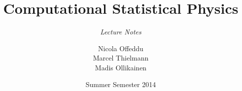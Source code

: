 \documentclass[%
paper=a4,
english,
fontsize=11.9pt,
twoside=true,
pointlessnumbers,
BCOR5mm,
titlepage=true,
headinclude,
cleardoublepage=empty,
openright,
appendixprefix,
chapterprefix=false,
DIV12
]{scrbook}
\begin{document}
\title{Computational Statistical Physics}
\subtitle{\emph{Lecture Notes}}
\author{Nicola Offeddu \\Marcel Thielmann \\Madis Ollikainen}
\date{Summer Semester 2014}

\frontmatter
\begin{titlepage}
  
\end{titlepage}

\cleardoublepage

\cleardoublepage

\renewcommand{\contentsname}{Table of contents}
\tableofcontents
\cleardoublepage

\mainmatter






























\appendix




\end{document}
